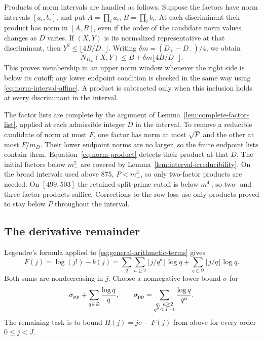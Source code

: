 Products of norm intervals are handled as follows. Suppose the factors
have norm intervals $[a_i,b_i]$, and put
$A=\prod_i a_i$, $B=\prod_i b_i$. At each discriminant their product
has norm in $[A,B]$, even if the order of the candidate norm values changes
as $D$ varies. If $(X,Y)$ is its normalized representative at that
discriminant, then $Y^2\leq\lfloor4B/D_-\rfloor$. Writing
$\delta m=(D_+-D_-)/4$, we obtain
\begin{equation}\label{eq:product-window-bound}
 N_{D_+}(X,Y)\leq B+\delta m\lfloor4B/D_-\rfloor.
\end{equation}
This proves membership in an upper norm window whenever the right side
is below its cutoff; any lower endpoint condition is checked in the same
way using \eqref{eq:norm-interval-affine}. A product is subtracted only
when this inclusion holds at every discriminant in the interval.

The factor lists are complete by the argument of
Lemma~\ref{lem:complete-factor-list}, applied at each admissible integer
$D$ in the interval. To remove a reducible candidate of norm at most $F$,
one factor has norm at most $\sqrt F$ and the other at most $F/m_D$.
Their lower endpoint norms are no larger, so the finite endpoint lists
contain them. Equation~\eqref{eq:norm-product} detects their product
at that $D$. The initial factors below $m_-^2$ are covered by
Lemma~\ref{lem:interval-irreducibility}. On the broad intervals used above
$875$, $P<m_-^3$, so only two-factor products are needed. On $[499,503]$
the retained split-prime cutoff is below $m_-^4$, so two- and three-factor
products suffice. Corrections to the row loss use only products proved
to stay below $P$ throughout the interval.

\subsection{The derivative remainder}\label{app:column-remainder}
Legendre's formula applied to \eqref{eq:general-arithmetic-terms} gives
\begin{equation}\label{eq:factorial-split-remainder}
 F(j)=\log(j!)-b(j)
 =\sum_q\sum_{a\geq2}\lfloor j/q^a\rfloor\log q
       +\sum_{q\in\mathcal Q}\lfloor j/q\rfloor\log q.
\end{equation}
Both sums are nondecreasing in $j$. Choose a nonnegative lower bound
$\sigma$ for
\[
 \sigma_{\rm pp}+\sum_{q\in\mathcal Q}\frac{\log q}{q},\qquad
 \sigma_{\rm pp}=\sum_{\substack{q,\ a\geq2\\q^a\leq J-1}}
                                      \frac{\log q}{q^a}.
\]
The remaining task is to bound $H(j)=j\sigma-F(j)$ from above for every
order $0\leq j<J$.

